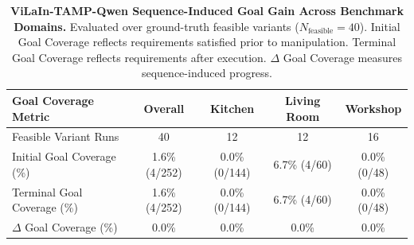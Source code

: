 \begin{table}[t]
\centering
\small
\caption{\textbf{ViLaIn-TAMP-Qwen Sequence-Induced Goal Gain Across Benchmark Domains.}
Evaluated over ground-truth feasible variants ($N_{\text{feasible}}=40$).
Initial Goal Coverage reflects requirements satisfied prior to manipulation. Terminal Goal Coverage reflects requirements after execution. $\Delta$ Goal Coverage measures sequence-induced progress.}
\label{tab:vilain_goal_attribution}
\begin{tabular}{l|c|ccc}
\hline
\textbf{Goal Coverage Metric} & \textbf{Overall} & \textbf{Kitchen} & \textbf{Living Room} & \textbf{Workshop} \\
\hline
Feasible Variant Runs & 40 & 12 & 12 & 16 \\
\hline
Initial Goal Coverage (\%) & 1.6\% (4/252) & 0.0\% (0/144) & 6.7\% (4/60) & 0.0\% (0/48) \\
Terminal Goal Coverage (\%) & 1.6\% (4/252) & 0.0\% (0/144) & 6.7\% (4/60) & 0.0\% (0/48) \\
$\Delta$ Goal Coverage (\%) & 0.0\% & 0.0\% & 0.0\% & 0.0\% \\
\hline
\end{tabular}
\end{table}
